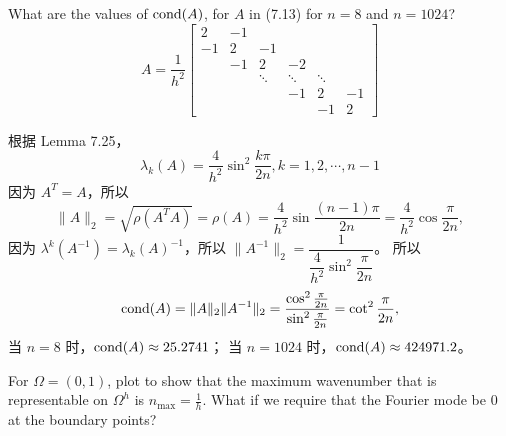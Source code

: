\documentclass[lang=cn,a4paper,newtx,bibend=bibtex]{elegantpaper}
\begin{document}
\begin{prob}[Exercise 9.8]
  What are the values of $\text{cond}(A)$, for $A$ in (7.13) for $n = 8$ and $n = 1024$?
  \[
    A = \dfrac1{h^2}
    \begin{bmatrix}
      2 & - 1 & & & & \\
      -1 & 2 & -1 & & & \\
      & -1 & 2 & -2 & & \\
      & & \ddots & \ddots & \ddots & \\
      & & & -1 & 2 & -1 \\
      & & & & -1 & 2
    \end{bmatrix}
  \]
\end{prob}

\begin{solution}
  根据 Lemma 7.25，
  \[
    \lambda_k (A) = \dfrac{4}{h^2} \sin^2 \dfrac{k\pi}{2n}, k = 1, 2, \cdots, n - 1
  \]
  因为 $A^T = A$，所以
  \[
    \|A\|_2 = \sqrt{\rho(A^T A)} = \rho (A) = \dfrac{4}{h^2} \sin \dfrac{(n - 1)\pi}{2n}
    = \dfrac{4}{h^2} \cos \dfrac{\pi}{2n},
  \]
  因为 $\lambda^k(A^{-1}) = \lambda_k(A)^{-1}$，所以 $\|A^{-1}\|_2 = \dfrac{1}{\dfrac{4}{h^2} \sin^2 \dfrac{\pi}{2n}}$。
  所以
  \[
    \text{cond}(A) = \| A\|_2 \|A^{-1}\|_2 = \dfrac{\cos^2 \frac{\pi}{2n}}{\sin^2 \frac{\pi}{2n}} = \cot^2 \dfrac{\pi}{2n},
  \]
  当 $n = 8$ 时，$\text{cond}(A) \approx 25.2741$；
  当 $n = 1024$ 时，$\text{cond}(A) \approx 424971.2 $。

\end{solution}

\begin{prob}[Exercise 9.11]
  For $\Omega = (0, 1)$, plot to show that the maximum
   wavenumber that is representable
  on $\Omega^h$ is $n_{\max} = \frac1h$.
  What if we require that the Fourier mode be $0$ at 
  the boundary points? 
\end{prob}
\end{document}
